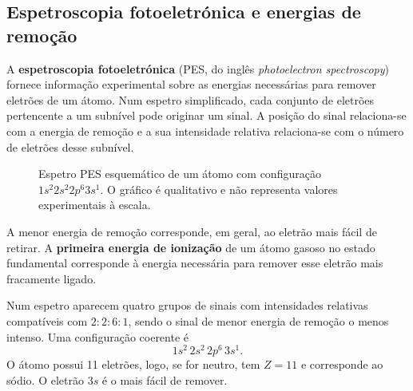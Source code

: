 \documentclass[11pt,a4paper,oneside]{book}
\begin{document}
\subsection*{Espetroscopia fotoeletrónica e energias de remoção}
A \textbf{espetroscopia fotoeletrónica} (PES, do inglês \emph{photoelectron spectroscopy}) fornece informação experimental sobre as energias necessárias para remover eletrões de um átomo. Num espetro simplificado, cada conjunto de eletrões pertencente a um subnível pode originar um sinal. A posição do sinal relaciona-se com a energia de remoção e a sua intensidade relativa relaciona-se com o número de eletrões desse subnível.

\begin{figure}[H]
\centering
{}
\caption{Espetro PES esquemático de um átomo com configuração $1s^2 2s^2 2p^6 3s^1$. O gráfico é qualitativo e não representa valores experimentais à escala.}
\end{figure}

\begin{conceito}
A menor energia de remoção corresponde, em geral, ao eletrão mais fácil de retirar. A \textbf{primeira energia de ionização} de um átomo gasoso no estado fundamental corresponde à energia necessária para remover esse eletrão mais fracamente ligado.
\end{conceito}

\begin{exemplo}[title={Exemplo resolvido -- interpretar um espetro PES qualitativo}]
Num espetro aparecem quatro grupos de sinais com intensidades relativas compatíveis com $2:2:6:1$, sendo o sinal de menor energia de remoção o menos intenso. Uma configuração coerente é
\[
1s^2\,2s^2\,2p^6\,3s^1.
\]
O átomo possui 11 eletrões, logo, se for neutro, tem $Z=11$ e corresponde ao sódio. O eletrão $3s$ é o mais fácil de remover.
\end{exemplo}
\end{document}
